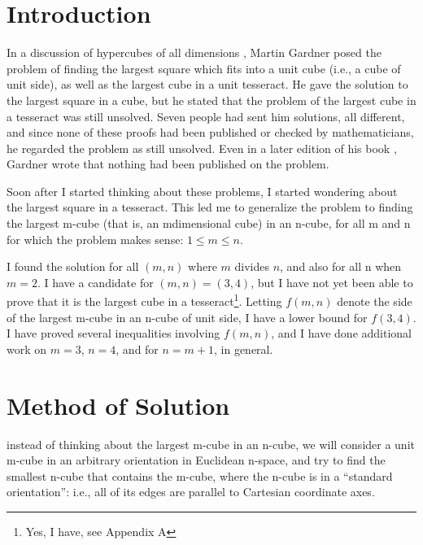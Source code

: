 \section*{Introduction}

In a discussion of hypercubes of all dimensions \cite{gardner1977}, Martin
Gardner posed the problem of finding the largest square which fits into a unit
cube (i.e., a cube of unit side), as well as the largest cube in a unit
tesseract.  He gave the solution to the largest square in a cube, but he stated
that the problem of the largest cube in a tesseract was still unsolved. Seven
people had sent him solutions, all different, and since none of these proofs
had been published or checked by mathematicians, he regarded the problem
as still unsolved. Even in a later edition of his book \cite{gardner1989},
Gardner wrote that nothing had been published on the problem.

Soon after I started thinking about these problems, I started
wondering about the largest square in a tesseract. This led me to
generalize the problem to finding the largest m-cube (that is, an mdimensional
cube) in an n-cube, for all m and n for which the problem
makes sense: $1 \leq m \leq n$.

I found the solution for all $(m,n)$ where $m$ divides $n$, and also for all
n when $m = 2$. I have a candidate for $(m,n) = (3,4)$, but I have not yet been
able to prove that it is the largest cube in a tesseract\footnote{Yes, I have,
see Appendix A}.  Letting $f(m,n)$ denote the side of the largest m-cube in
an n-cube of unit side, I have a lower bound for $f(3,4)$. I have proved
several inequalities involving $f(m,n)$, and I have done additional work on
$m = 3$, $n = 4$, and for $n = m + 1$, in general.

\section*{Method of Solution}

instead of thinking about the largest m-cube in an n-cube, we will
consider a unit m-cube in an arbitrary orientation in Euclidean n-space,
and try to find the smallest n-cube that contains the m-cube, where the n-cube
is in a ``standard orientation'': i.e., all of its edges are parallel to
Cartesian coordinate axes.

